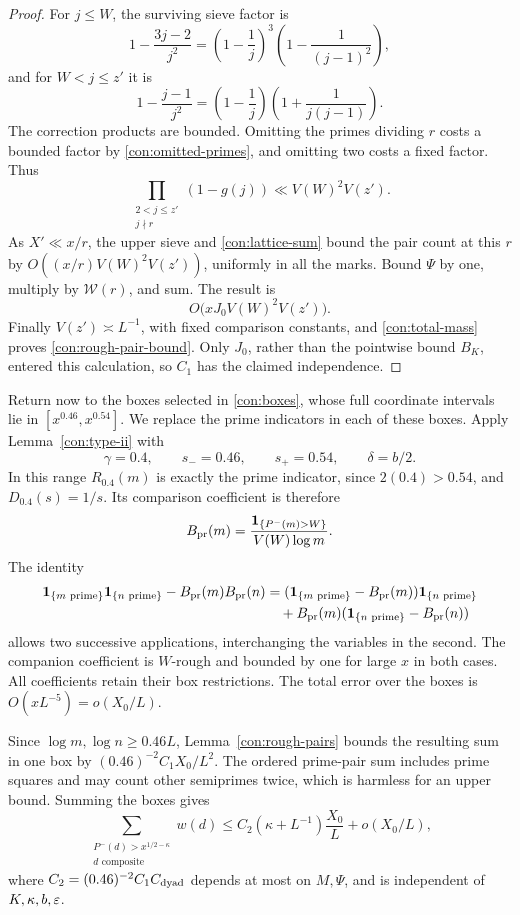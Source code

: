\begin{proof}
For \(j\le W\), the surviving sieve factor is
\[
 1-\frac{3j-2}{j^2}
       =\left(1-\frac1j\right)^3
                         \left(1-\frac1{(j-1)^2}\right),
\]
and for \(W<j\le z'\) it is
\[
 1-\frac{j-1}{j^2}
       =\left(1-\frac1j\right)
                         \left(1+\frac1{j(j-1)}\right).
\]
The correction products are bounded.  Omitting the primes dividing
\(r\) costs a bounded factor by \eqref{con:omitted-primes}, and
omitting two costs a fixed factor.  Thus
\[
 \prod_{\substack{2<j\le z'\\j\nmid r}}(1-g(j))
       \ll V(W)^2V(z').
\]
As \(X'\ll x/r\), the upper sieve and \eqref{con:lattice-sum}
bound the pair count at this \(r\) by
\(O((x/r)V(W)^2V(z'))\), uniformly in all the marks.  Bound
\(\Psi\) by one, multiply by \(\mathcal W(r)\), and sum.  The
result is
\[
 O\bigl(xJ_0V(W)^2V(z')\bigr).
\]
Finally \(V(z')\asymp L^{-1}\), with fixed comparison constants,
and \eqref{con:total-mass} proves \eqref{con:rough-pair-bound}.
Only \(J_0\), rather than the pointwise bound \(B_K\), entered this
calculation, so \(C_1\) has the claimed independence.
\end{proof}

Return now to the boxes selected in \eqref{con:boxes}, whose full
coordinate intervals lie in \([x^{0.46},x^{0.54}]\). We replace
the prime indicators in each of these boxes. Apply
Lemma~\ref{con:type-ii} with
\[
 \gamma=0.4,\qquad s_-=0.46,\qquad s_+=0.54,
 \qquad\delta=b/2.
\]
In this range \(R_{0.4}(m)\) is exactly the prime indicator, since
\(2(0.4)>0.54\), and \(D_{0.4}(s)=1/s\).  Its comparison
coefficient is therefore
\[
 B_{\rm pr}(m)=\frac{\mathbf{1}_{\{P^-(m)>W\}}}{V(W)\log m}.
\]
The identity
\[
 \begin{aligned}
 \mathbf{1}_{\{m\text{ prime}\}}\mathbf{1}_{\{n\text{ prime}\}}
       -B_{\rm pr}(m)B_{\rm pr}(n)
 &=(\mathbf{1}_{\{m\text{ prime}\}}-B_{\rm pr}(m))\mathbf{1}_{\{n\text{ prime}\}}\\
 &\quad+B_{\rm pr}(m)(\mathbf{1}_{\{n\text{ prime}\}}-B_{\rm pr}(n))
 \end{aligned}
\]
allows two successive applications, interchanging the variables in
the second.  The companion coefficient is \(W\)-rough and bounded
by one for large \(x\) in both cases.  All coefficients retain
their box restrictions.  The total error over the boxes is
\(O(xL^{-5})=o(X_0/L)\).

Since \(\log m,\log n\ge0.46L\), Lemma~\ref{con:rough-pairs}
bounds the resulting sum in one box by
\((0.46)^{-2}C_1X_0/L^2\).  The ordered prime-pair sum includes
prime squares and may count other semiprimes twice, which is harmless
for an upper bound.  Summing the boxes gives
\begin{equation}\label{con:balanced-cost}
 \sum_{\substack{P^-(d)>x^{1/2-\kappa}\\d\text{ composite}}}w(d)
       \le C_2(\kappa+L^{-1})\frac{X_0}{L}+o(X_0/L),
\end{equation}
where \(C_2=(0.46)^{-2}C_1C_{\rm dyad}\) depends at most on
\(M,\Psi\), and is independent of \(K,\kappa,b,\varepsilon\).

